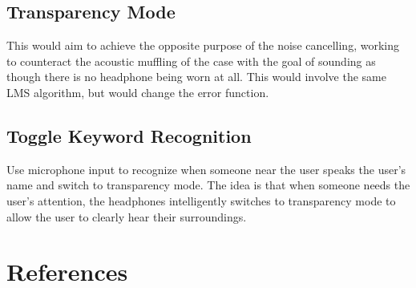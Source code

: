 \documentclass{fpgairpods}
\begin{document}
\begin{multicols*}{2}
\subsection{Transparency Mode}
This would aim to achieve the opposite purpose of the noise cancelling, working to counteract the acoustic muffling of the case with the goal of sounding as though there is no headphone being worn at all. This would involve the same LMS algorithm, but would change the error function.

\subsection{Toggle Keyword Recognition}
Use microphone input to recognize when someone near the user speaks the user's name and switch to transparency mode. The idea is that when someone needs the user's attention, the headphones intelligently switches to transparency mode to allow the user to clearly hear their surroundings.

\section{References}
\vspace{-7mm}
\printbibliography

\end{multicols*}
\end{document}
